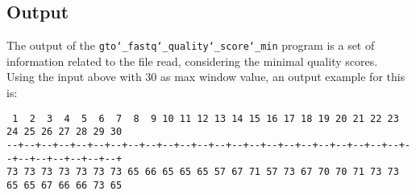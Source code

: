 \subsection*{Output}
The output of the \texttt{gto\char`_fastq\char`_quality\char`_score\char`_min} program is a set of information related to the file read, considering the minimal quality scores.  \\
Using the input above with 30 as max window value, an output example for this is:
\begin{lstlisting}
 1  2  3  4  5  6  7  8  9 10 11 12 13 14 15 16 17 18 19 20 21 22 23 24 25 26 27 28 29 30 
--+--+--+--+--+--+--+--+--+--+--+--+--+--+--+--+--+--+--+--+--+--+--+--+--+--+--+--+--+--+
73 73 73 73 73 73 73 65 66 65 65 65 57 67 71 57 73 67 70 70 71 73 73 65 65 67 66 66 73 65 
\end{lstlisting}